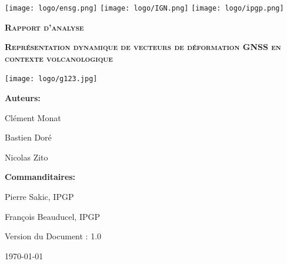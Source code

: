 \documentclass[11pt]{article}
\begin{document}
\begin{titlepage}
    \begin{center}
        
    
    \texttt{[image: logo/ensg.png]}
    \hspace{2cm}
    \texttt{[image: logo/IGN.png]}
    \hspace{2cm}
    \texttt{[image: logo/ipgp.png]}
    \par\vspace{2cm}
    
    {\scshape\Huge \textbf{Rapport d'analyse}\par}    
    \vspace{0.5cm}
    {\scshape\Large \textbf{Représentation dynamique de vecteurs de déformation GNSS en 
contexte volcanologique }\par}
    \vspace{1cm}

    \texttt{[image: logo/g123.jpg]}
    \par\vspace{1cm}

    \begin{multicols}{2}
        {\large
        \textbf{Auteurs: }\par
        Clément Monat\par
        Bastien Doré\par
        Nicolas Zito\par
        
        }
        \vspace{1cm}
        
        {\large
        \textbf{Commanditaires: }\par
        Pierre Sakic, IPGP\par
        François Beauducel, IPGP\par
        }
        \vfill
    \end{multicols}

    \vspace{1cm}
    
    {\large Version du Document : 1.0\par}
    
    \vfill
    
    {\large \today\par}
    \end{center}
\end{titlepage}
\end{document}
